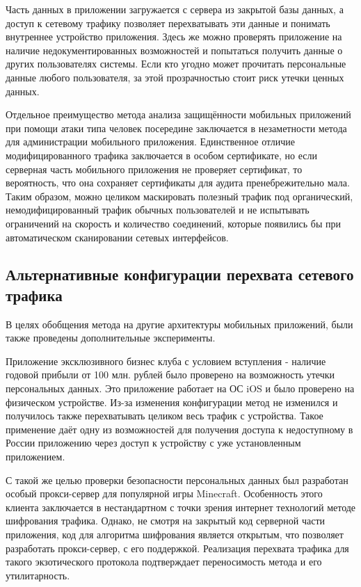 Часть данных в приложении загружается с сервера из закрытой базы данных, а доступ к сетевому трафику позволяет перехватывать эти данные и понимать внутреннее устройство приложения. Здесь же можно проверять приложение на наличие недокументированных возможностей и попытаться получить данные о других пользователях системы. Если кто угодно может прочитать персональные данные любого пользователя, за этой прозрачностью стоит риск утечки ценных данных.

Отдельное преимущество метода анализа защищённости мобильных приложений при помощи атаки типа человек посередине заключается в незаметности метода для администрации мобильного приложения. Единственное отличие модифицированного трафика заключается в особом сертификате, но если серверная часть мобильного приложения не проверяет сертификат, то вероятность, что она сохраняет сертификаты для аудита пренебрежительно мала. Таким образом, можно целиком маскировать полезный трафик под органический, немодифицированный трафик обычных пользователей и не испытывать ограничений на скорость и количество соединений, которые появились бы при автоматическом сканировании сетевых интерфейсов.

\subsection{Альтернативные конфигурации перехвата сетевого трафика}

В целях обобщения метода на другие архитектуры мобильных приложений, были также проведены дополнительные эксперименты.

Приложение эксклюзивного бизнес клуба с условием вступления - наличие годовой прибыли от 100 млн. рублей было проверено на возможность утечки персональных данных. Это приложение работает на ОС iOS и было проверено на физическом устройстве. Из-за изменения конфигурации метод не изменился и получилось также перехватывать целиком весь трафик с устройства. Такое применение даёт одну из возможностей для получения доступа к недоступному в России приложению через доступ к устройству с уже установленным приложением.

С такой же целью проверки безопасности персональных данных был разработан особый прокси-сервер для популярной игры Minecraft. Особенность этого клиента заключается в нестандартном с точки зрения интернет технологий методе шифрования трафика. Однако, не смотря на закрытый код серверной части приложения, код для алгоритма шифрования является открытым, что позволяет разработать прокси-сервер, с его поддержкой. Реализация перехвата трафика для такого экзотического протокола подтверждает переносимость метода и его утилитарность.

